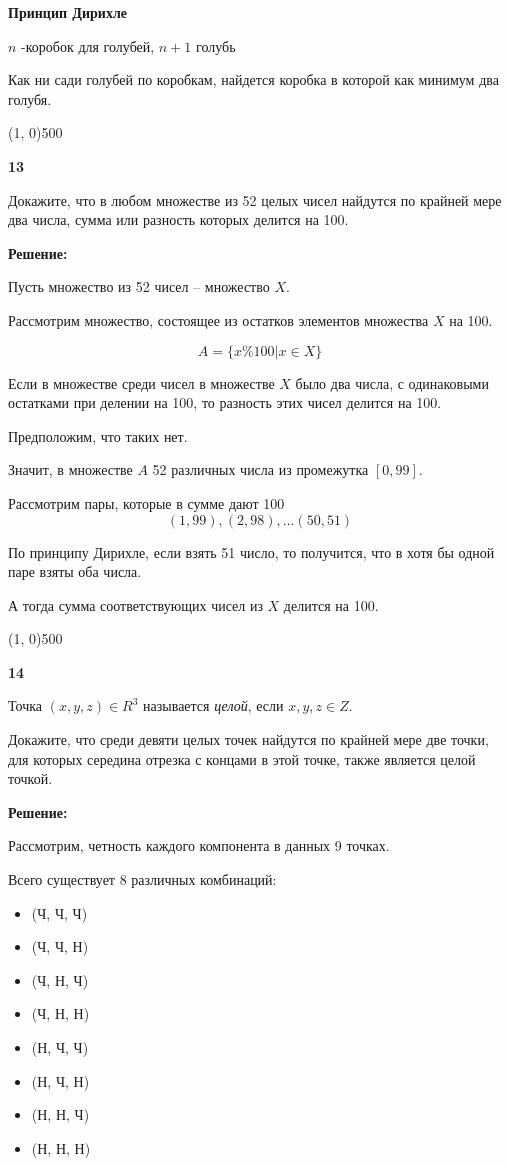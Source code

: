 \documentclass{article}
\begin{document}
\textbf{ Принцип Дирихле }

$n$ -коробок для голубей, $n + 1$ голубь

Как ни сади голубей по коробкам, найдется коробка в которой как минимум два голубя.

\line(1, 0){500}

\textbf{13}

Докажите, что в любом множестве из 52 целых чисел найдутся по крайней мере два числа, сумма или разность которых делится на 100.

\textbf{Решение:}

Пусть множество из 52 чисел -- множество $X$. 

Рассмотрим множество, состоящее из остатков элементов множества  $X$ на 100. 

$$ A = \{ x \% 100 | x \in X \}$$

Если в множестве среди чисел в множестве $X$ было два числа, с одинаковыми остатками при делении на 100, то разность этих чисел делится на 100. 

Предположим, что таких нет.

Значит, в множестве $A$ 52 различных числа  из промежутка $[0, 99]$. 

Рассмотрим пары, которые в сумме дают 100 $$(1, 99), (2, 98), ... (50, 51)$$

По принципу Дирихле, если взять 51 число, то получится, что в хотя бы одной паре взяты оба числа. 

А тогда сумма соответствующих чисел из $X$ делится на 100.

\line(1, 0){500}

\textbf{14}

Точка $(x, y, z) \in R^3$ называется \textit{целой}, если $x, y, z \in Z$.

Докажите, что среди девяти целых точек найдутся по крайней мере две точки, для которых середина отрезка с концами в этой точке, также является целой точкой. 

\textbf{Решение:}

Рассмотрим, четность каждого компонента в данных 9 точках. 

Всего существует 8 различных комбинаций: 

\begin{itemize}
    \item (Ч, Ч, Ч)
    \item (Ч, Ч, Н)
    \item (Ч, Н, Ч)
    \item (Ч, Н, Н)
    \item (Н, Ч, Ч)
    \item (Н, Ч, Н)
    \item (Н, Н, Ч)
    \item (Н, Н, Н)
\end{itemize}
\end{document}

